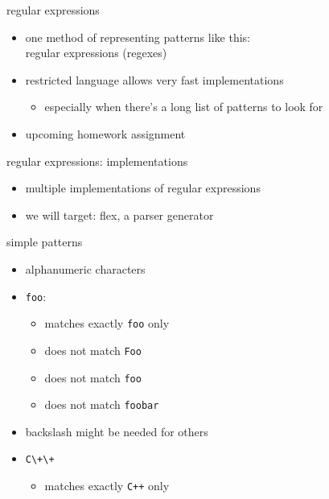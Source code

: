 
\begin{frame}{regular expressions}
    \begin{itemize}
    \item one method of representing patterns like this: \\
          regular expressions (regexes)
    \item restricted language allows very fast implementations
        \begin{itemize}
        \item especially when there's a long list of patterns to look for
        \end{itemize}
    \item upcoming homework assignment
    \end{itemize}
\end{frame}

\begin{frame}{regular expressions: implementations}
    \begin{itemize}
    \item multiple implementations of regular expressions
    \item we will target: flex, a parser generator
    \end{itemize}
\end{frame}

\begin{frame}[fragile,label=simplePat]{simple patterns}
    \begin{itemize}
    \item alphanumeric characters 
    \item {\tt foo}:
        \begin{itemize}
        \item matches exactly {\tt foo} only
        \item does not match {\tt Foo}
        \item does not match \verb*|foo |
        \item does not match {\tt foobar}
        \end{itemize}
    \item backslash might be needed for others
    \item \verb|C\+\+|
        \begin{itemize}
        \item matches exactly {\tt C++} only
        \end{itemize}
    \end{itemize}
\end{frame}


